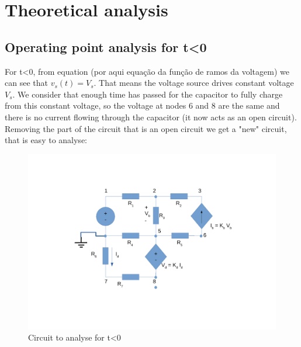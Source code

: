 \section{Theoretical analysis}
\label{sec:ta}
\subsection{Operating point analysis for t\textless0}
\label{ssec:tl}
For t\textless0, from equation (por aqui equação da função de ramos da voltagem) we can see that $v_s (t)= V_s$. That means the voltage source drives constant voltage $V_s$. We consider that enough time has passed for the capacitor to fully charge from this constant voltage, so the voltage at nodes 6 and 8 are the same and there is no current flowing through the capacitor (it now acts as an open circuit). Removing the part of the circuit that is an open circuit we get a "new" circuit, that is easy to analyse: \\
\begin{figure}[H] \centering
\includegraphics[width=0.8\linewidth]{tmenor0.pdf}
\caption{Circuit to analyse for t\textless0}
\label{fig:zim}
\end{figure}

